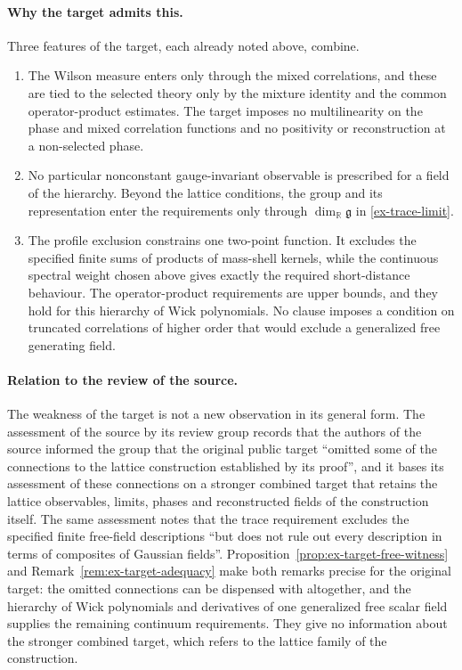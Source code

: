 \paragraph{Why the target admits this.}
Three features of the target, each already noted above, combine.
\begin{enumerate}
\item The Wilson measure enters only through the mixed correlations, and
these are tied to the selected theory only by the mixture identity and the
common operator-product estimates. The target imposes no multilinearity on
the phase and mixed correlation functions and no positivity or
reconstruction at a non-selected phase.
\item No particular nonconstant gauge-invariant observable is prescribed for
a field of the hierarchy. Beyond the lattice conditions, the group and its
representation enter the requirements only through
\(\dim_{\mathbb R}\mathfrak g\) in \eqref{ex-trace-limit}.
\item The profile exclusion constrains one two-point function. It excludes
the specified finite sums of products of mass-shell kernels, while the
continuous spectral weight chosen above gives exactly the required
short-distance behaviour. The operator-product requirements are upper
bounds, and they hold for this hierarchy of Wick polynomials. No clause
imposes a condition on truncated correlations of higher order that would
exclude a generalized free generating field.
\end{enumerate}

\paragraph{Relation to the review of the source.}
The weakness of the target is not a new observation in its general form. The
assessment of the source by its review group
\cite[Sections~7.3 and~9]{YMG26} records that the authors of the source informed the group that the
original public target ``omitted some of the connections to the lattice
construction established by its proof'', and it bases its assessment of
these connections on a stronger combined target that retains the lattice observables, limits, phases
and reconstructed fields of the construction itself. The same assessment
notes that the trace requirement excludes the specified finite free-field
descriptions ``but does not rule out every description in terms of composites
of Gaussian fields''. Proposition~\ref{prop:ex-target-free-witness} and
Remark~\ref{rem:ex-target-adequacy} make both remarks precise for the
original target: the omitted connections can be dispensed with altogether,
and the hierarchy of Wick polynomials and derivatives of one generalized free
scalar field supplies the remaining continuum requirements. They give no
information about the stronger combined target, which refers to the lattice
family of the construction.

